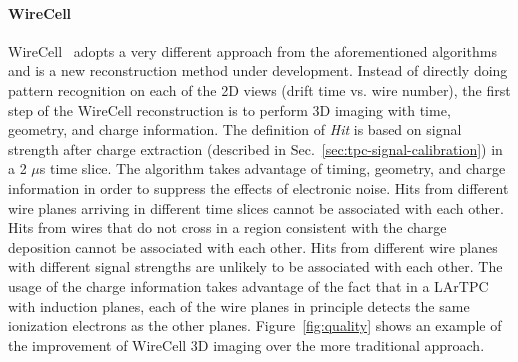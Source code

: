 \paragraph{WireCell}
WireCell~\cite{wire-cell} adopts a very different approach from the 
aforementioned algorithms and is a new reconstruction method under development.
Instead of directly doing pattern recognition on each of the 2D views (drift 
time vs. wire number), the first step of the WireCell reconstruction is to 
perform 3D imaging with time, geometry, and charge information. The definition
of \textit{Hit} is based on signal strength after charge extraction (described in 
Sec.~\ref{sec:tpc-signal-calibration}) in a 2 $\mu$s time slice. 
The algorithm takes advantage of timing, geometry, and charge information in order to
suppress the effects of electronic noise.
Hits from  different wire planes arriving in different time 
slices cannot be associated with each other. Hits
from wires that do not cross in a region consistent with the charge deposition cannot be associated with each other. 
Hits from different wire planes
with different signal strengths are unlikely to be associated with each other. The 
usage of the charge information takes advantage of the fact that in a LArTPC with induction planes,
each of the wire planes in principle detects the same ionization electrons as the other planes. 
Figure~\ref{fig:quality} shows an example of the improvement of WireCell 3D imaging
over the more traditional approach. 

